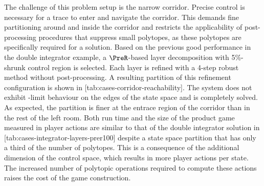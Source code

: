     The challenge of this problem setup is the narrow corridor.
    Precise control is necessary for a trace to enter and navigate the corridor.
    This demands fine partitioning around and inside the corridor and restricts the applicability of post-processing procedures that suppress small polytopes, as these polytopes are specifically required for a solution.
    Based on the previous good performance in the double integrator example, a $\PreR$-based layer decomposition with 5\%-shrunk control region is selected.
    Each layer is refined with a 4-step robust method without post-processing.
    A resulting partition of this refinement configuration is shown in [tab:cases-corridor-reachability].
    The system does not exhibit \epsilon-limit behaviour on the edges of the state space and is completely solved.
    As expected, the partition is finer at the entrace region of the corridor than in the rest of the left room.
    Both run time and the size of the product game measured in player actions are similar to that of the double integrator solution in [tab:cases-integrator-layers-prer100] despite a state space partition that has only a third of the number of polytopes.
    This is a consequence of the additional dimension of the control space, which results in more player actions per state.
    The increased number of polytopic operations required to compute these actions raises the cost of the game construction.

\stopsubsection


\startsubsection[title={Reachability Controller}]


